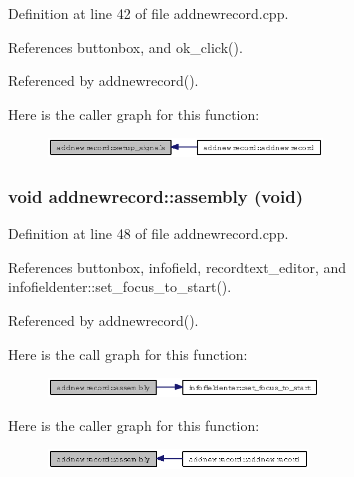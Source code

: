 Definition at line 42 of file addnewrecord.cpp.

References buttonbox, and ok\_\-click().

Referenced by addnewrecord().

Here is the caller graph for this function:\begin{figure}[H]
\begin{center}
\leavevmode
\includegraphics[width=206pt]{classaddnewrecord_16b5cb93b2861de3fb4da880a09a683f_icgraph}
\end{center}
\end{figure}
\subsubsection{\setlength{\rightskip}{0pt plus 5cm}void addnewrecord::assembly (void)\hspace{0.3cm}{\tt  [private]}}\label{classaddnewrecord_303c727d43461d35848dfa41477899b3}




Definition at line 48 of file addnewrecord.cpp.

References buttonbox, infofield, recordtext\_\-editor, and infofieldenter::set\_\-focus\_\-to\_\-start().

Referenced by addnewrecord().

Here is the call graph for this function:\begin{figure}[H]
\begin{center}
\leavevmode
\includegraphics[width=203pt]{classaddnewrecord_303c727d43461d35848dfa41477899b3_cgraph}
\end{center}
\end{figure}


Here is the caller graph for this function:\begin{figure}[H]
\begin{center}
\leavevmode
\includegraphics[width=196pt]{classaddnewrecord_303c727d43461d35848dfa41477899b3_icgraph}
\end{center}
\end{figure}


